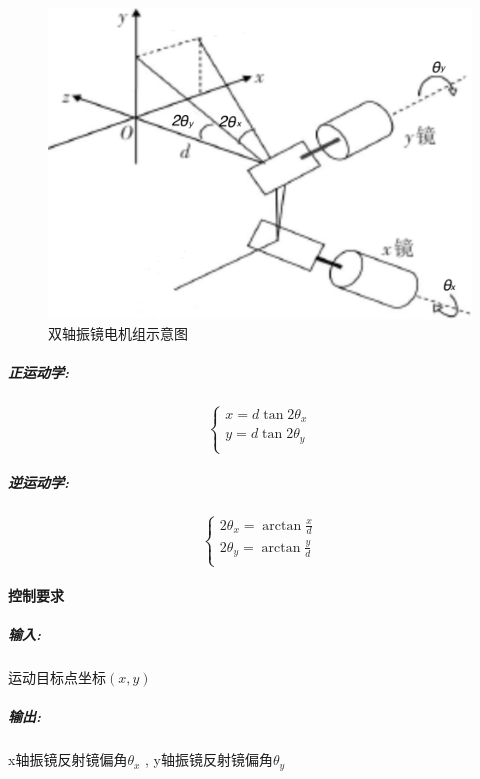 \documentclass[a4paper,12pt,onecolumn,twoside]{article}
\begin{document}
\begin{figure}[ht]
\includegraphics[width=1\linewidth]{MG4.png}
\caption{双轴振镜电机组示意图}
\end{figure}

\subparagraph{正运动学:}
\begin{equation}
\left\{
\begin{array}{c}
x=d\tan2\theta_x \\
y=d\tan2\theta_y\\ 
\end{array}
\right.
\end{equation}
\subparagraph{逆运动学:}
\begin{equation}
\left\{
\begin{array}{l}
2\theta_x = \arctan\frac{x}{d}  \\
2\theta_y = \arctan\frac{y}{d} \\
\end{array}
\right.
\end{equation}
 \paragraph{控制要求}
\subparagraph{输入:}
运动目标点坐标$(x,y)$
\subparagraph{输出:}
x轴振镜反射镜偏角$\theta_x$ , y轴振镜反射镜偏角$\theta_y$
\end{document}
